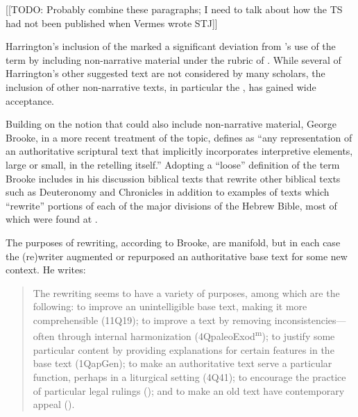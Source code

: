 [[TODO: Probably combine these paragraphs; I need to talk about how the TS had not been published when Vermes wrote STJ]]

Harrington's inclusion of the \templescroll marked a significant deviation from \vermes's use of the term by including non-narrative material under the rubric of \rwb. While several of Harrington's other suggested text are not considered \rwb by many scholars, the inclusion of other non-narrative texts, in particular the \templescroll, has gained wide acceptance.\autocite{bernstein_textus2005} 

Building on the notion that \rwb could also include non-narrative material, George Brooke, in a more recent treatment of the topic, defines \rwb as ``any representation of an authoritative scriptural text that implicitly incorporates interpretive elements, large or small, in the retelling itself.''\autocite[777]{brooke_schiffman-vanderkam2000} Adopting a ``loose'' definition of the term Brooke includes in his discussion biblical texts that rewrite other biblical texts such as Deuteronomy and Chronicles in addition to examples of texts which ``rewrite'' portions of each of the major divisions of the Hebrew Bible, most of which were found at \qumran.\autocites[Brooke categorizes the texts as follows: Reworked Pentateuchs, Rewritten Pentateuchal narratives, Rewritten Pentateuchal laws, Rewritten Former Prophets, Rewritten Latter Prophets, and Rewritten Writings.][778--780]{brooke_schiffman-vanderkam2000}[See also][]{brooke_herbert-tov2002} 

The purposes of rewriting, according to Brooke, are manifold, but in each case the (re)writer augmented or repurposed an authoritative base text for some new context. He writes: 

\begin{quote}
    The rewriting seems to have a variety of purposes, among which are the following: to improve an unintelligible base text, making it more comprehensible (11Q19); to improve a text by removing inconsistencies---often through internal harmonization (4QpaleoExod\textsuperscript{m}); to justify some particular content by providing explanations for certain features in the base text (1QapGen); to make an authoritative text serve a particular function, perhaps in a liturgical setting (4Q41); to encourage the practice of particular legal rulings (\jub); and to make an old text have contemporary appeal (\templescroll).\autocite[778]{brooke_schiffman-vanderkam2000}
\end{quote} 

